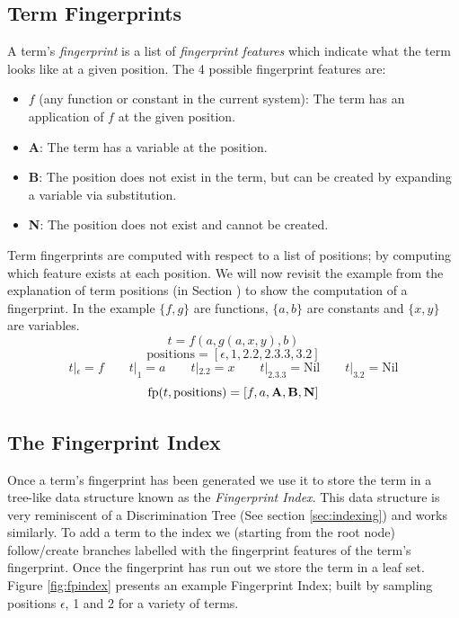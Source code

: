\subsection{Term Fingerprints}
\label{sec:fingerprints}

A term's \emph{fingerprint} is a list of \emph{fingerprint features} which
indicate what the term looks like at a given position. The 4 possible
fingerprint features are:
\begin{itemize}
\item $f$ (any function or constant in the current system): The term has an application of $f$ at the given position.
\item \textbf{A}: The term has a variable at the position.
\item \textbf{B}: The position does not exist in the term, but can be created
by expanding a variable via substitution.
\item \textbf{N}: The position does not exist and cannot be created.
\end{itemize}
Term fingerprints are computed with respect to a list of positions; by
computing which feature exists at each position. We will now revisit the example from
the explanation of term positions (in Section \label{sec:terminology}) to show
the computation of a fingerprint. In the example $\{f,g\}$ are functions, $\{a,b\}$ are
constants and $\{x,y\}$ are variables.
\[t = f(a, g(a, x, y), b)\]
\[\text{positions} = [\epsilon, 1, 2.2, 2.3.3, 3.2] \]
\[t|_{\epsilon} = f \quad\quad t|_{1} = a \quad\quad  t|_{2.2} = x \quad\quad  t|_{2.3.3} = \text{Nil} \quad\quad  t|_{3.2} = \text{Nil}\]
\[\text{fp}(t, \text{positions}) = [f, a, \textbf{A}, \textbf{B}, \textbf{N}] \]

\subsection{The Fingerprint Index}
\label{sec:fpindex}

Once a term's fingerprint has been generated we use it to store the term in a tree-like
data structure known as the \emph{Fingerprint Index}. 
This data structure is very reminiscent of a Discrimination Tree (See section \ref{sec:indexing})
and works similarly. To add a term to the index we (starting from the root node) follow/create
branches labelled with the fingerprint features of the term's fingerprint. Once the fingerprint has run
out we store the term in a leaf set. Figure \ref{fig:fpindex} presents an example Fingerprint
Index; built by sampling positions $\epsilon$, 1 and 2 for a variety of terms.


